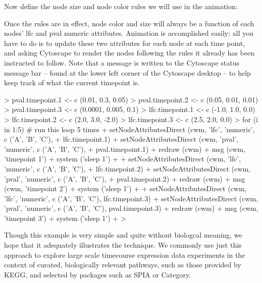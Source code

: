 \documentclass[12pt]{article}
\begin{document}
Now define the node size and node color rules we will use in the animation:

\begin{Schunk}
\end{Schunk}
Once the rules are in effect, node color and size will always be a function of each nodes' lfc and pval numeric attributes.  Animation is accomplished easily:  all you have to do is to update these two attributes for each node at each time point, and asking Cytoscape to render the nodes following the rules it already has been instructed to follow.  Note that a message is written to the Cytoscape status message bar -- found at the lower left corner of the Cytoscape desktop -- to help keep track of what the current timepoint is.
\begin{Schunk}
\begin{Sinput}
>   pval.timepoint.1 <- c (0.01, 0.3, 0.05)
>   pval.timepoint.2 <- c (0.05, 0.01, 0.01)
>   pval.timepoint.3 <- c (0.0001, 0.005, 0.1)
>   lfc.timepoint.1 <- c (-1.0, 1.0, 0.0)
>   lfc.timepoint.2 <- c (2.0, 3.0, -2.0)
>   lfc.timepoint.3 <- c (2.5, 2.0, 0.0)
>   for (i in 1:5) {  # run this loop 5 times
+     setNodeAttributesDirect (cwm, 'lfc',  'numeric', c ('A', 'B', 'C'),
+                              lfc.timepoint.1)
+     setNodeAttributesDirect (cwm, 'pval', 'numeric', c ('A', 'B', 'C'),
+                              pval.timepoint.1)
+     redraw (cwm)
+     msg (cwm, 'timepoint 1')
+     system ('sleep 1')
+ 
+     setNodeAttributesDirect (cwm, 'lfc',  'numeric', c ('A', 'B', 'C'),
+                              lfc.timepoint.2)
+     setNodeAttributesDirect (cwm, 'pval', 'numeric', c ('A', 'B', 'C'),
+                              pval.timepoint.2)
+     redraw (cwm)
+     msg (cwm, 'timepoint 2')
+     system ('sleep 1')
+ 
+     setNodeAttributesDirect (cwm, 'lfc',  'numeric', c ('A', 'B', 'C'), lfc.timepoint.3)
+     setNodeAttributesDirect (cwm, 'pval', 'numeric', c ('A', 'B', 'C'), pval.timepoint.3)
+     redraw (cwm)
+     msg (cwm, 'timepoint 3')
+     system ('sleep 1')
+     }
> 
\end{Sinput}
\end{Schunk}
Though this example is very simple and quite without biologcal meaning, we hope that it adequately illustrates the technique.  We commonly use just this approach to explore large scale timecourse expression data experiments in the context of curated, biologically relevant pathways, such as those provided by KEGG, and selected by packages such as SPIA or Category.
\end{document}
